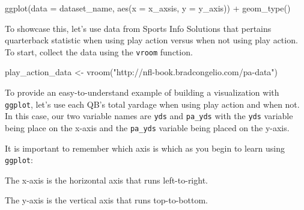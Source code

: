 \documentclass[
  letterpaper,
]{krantz}
\newenvironment{Shaded}{\begin{snugshade}}{\end{snugshade}}
\newcommand{\AttributeTok}[1]{\textcolor[rgb]{0.40,0.45,0.13}{#1}}
\newcommand{\FunctionTok}[1]{\textcolor[rgb]{0.28,0.35,0.67}{#1}}
\newcommand{\NormalTok}[1]{\textcolor[rgb]{0.00,0.23,0.31}{#1}}
\newcommand{\OtherTok}[1]{\textcolor[rgb]{0.00,0.23,0.31}{#1}}
\newcommand{\SpecialCharTok}[1]{\textcolor[rgb]{0.37,0.37,0.37}{#1}}
\newcommand{\StringTok}[1]{\textcolor[rgb]{0.13,0.47,0.30}{#1}}
\begin{document}
\begin{Shaded}
\begin{Highlighting}[]
\FunctionTok{ggplot}\NormalTok{(}\AttributeTok{data =} \StringTok{\textquotesingle{}dataset\_name\textquotesingle{}}\NormalTok{, }\FunctionTok{aes}\NormalTok{(}\AttributeTok{x =} \StringTok{\textquotesingle{}x\_axsis\textquotesingle{}}\NormalTok{, }\AttributeTok{y =} \StringTok{\textquotesingle{}y\_axis\textquotesingle{}}\NormalTok{)) }\SpecialCharTok{+}
  \FunctionTok{geom\_type}\NormalTok{()}
\end{Highlighting}
\end{Shaded}

To showcase this, let's use data from Sports Info Solutions that
pertains quarterback statistic when using play action versus when not
using play action. To start, collect the data using the \texttt{vroom}
function.

\begin{Shaded}
\begin{Highlighting}[]
\NormalTok{play\_action\_data }\OtherTok{\textless{}{-}} \FunctionTok{vroom}\NormalTok{(}\StringTok{"http://nfl{-}book.bradcongelio.com/pa{-}data"}\NormalTok{)}
\end{Highlighting}
\end{Shaded}

To provide an easy-to-understand example of building a visualization
with \texttt{ggplot}, let's use each QB's total yardage when using play
action and when not. In this case, our two variable names are
\texttt{yds} and \texttt{pa\_yds} with the \texttt{yds} variable being
place on the x-axis and the \texttt{pa\_yds} variable being placed on
the y-axis.

\begin{tcolorbox}[enhanced jigsaw, colback=white, leftrule=.75mm, breakable, colframe=quarto-callout-tip-color-frame, bottomtitle=1mm, rightrule=.15mm, left=2mm, opacityback=0, bottomrule=.15mm, arc=.35mm, coltitle=black, colbacktitle=quarto-callout-tip-color!10!white, toptitle=1mm, titlerule=0mm, title=\textcolor{quarto-callout-tip-color}{\faLightbulb}\hspace{0.5em}{Tip}, toprule=.15mm, opacitybacktitle=0.6]

It is important to remember which axis is which as you begin to learn
using \texttt{ggplot}:

The x-axis is the horizontal axis that runs left-to-right.

The y-axis is the vertical axis that runs top-to-bottom.

\end{tcolorbox}
\end{document}

